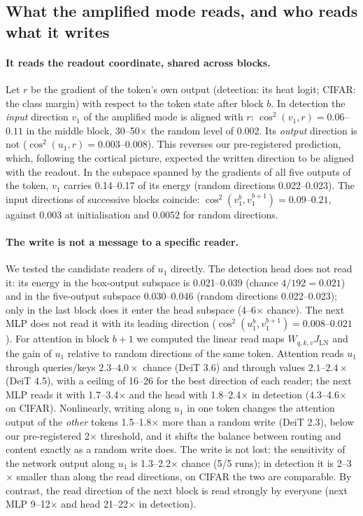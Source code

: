 \documentclass[10pt]{article}
\begin{document}
\subsection{What the amplified mode reads, and who reads what it writes}
\label{sec:readwrite}

\paragraph{It reads the readout coordinate, shared across blocks.} Let $r$ be the gradient of the token's own output (detection: its heat
logit; CIFAR: the class margin) with respect to the token state after block $b$. In detection the \emph{input} direction $v_1$ of the
amplified mode is aligned with $r$: $\cos^2(v_1,r)=0.06$--$0.11$ in the middle block, 30--50$\times$ the random level of 0.002. Its
\emph{output} direction is not ($\cos^2(u_1,r)=0.003$--$0.008$). This reverses our pre-registered prediction, which, following the cortical
picture, expected the written direction to be aligned with the readout. In the subspace spanned by the gradients of all five outputs of
the token, $v_1$ carries 0.14--0.17 of its energy (random directions 0.022--0.023). The input directions of successive blocks coincide:
$\cos^2(v_1^{b},v_1^{b+1})=0.09$--$0.21$, against 0.003 at initialisation and 0.0052 for random directions.

\paragraph{The write is not a message to a specific reader.} We tested the candidate readers of $u_1$ directly. The detection head does
not read it: its energy in the box-output subspace is 0.021--0.039 (chance $4/192=0.021$) and in the five-output subspace 0.030--0.046
(random directions 0.022--0.023); only in the last block does it enter the head subspace (4--6$\times$ chance). The next MLP does not read it with its leading direction
($\cos^2(u_1^b,v_1^{b+1})=0.008$--$0.021$). For attention in block $b+1$ we computed the linear read maps $W_{q,k,v}J_{\mathrm{LN}}$ and the
gain of $u_1$ relative to random directions of the same token. Attention reads $u_1$ through queries/keys $2.3$--$4.0\times$ chance (DeiT
3.6) and through values $2.1$--$2.4\times$ (DeiT 4.5), with a ceiling of 16--26 for the best direction of each reader; the next MLP reads it
with 1.7--3.4$\times$ and the head with 1.8--2.4$\times$ in detection (4.3--4.6$\times$ on CIFAR). Nonlinearly, writing along $u_1$ in one token changes the attention output of the
\emph{other} tokens 1.5--1.8$\times$ more than a random write (DeiT 2.3), below our pre-registered 2$\times$ threshold, and it shifts the
balance between routing and content exactly as a random write does. The write is not lost: the sensitivity of the network output along
$u_1$ is 1.3--2.2$\times$ chance (5/5 runs); in detection it is 2--3$\times$ smaller than along the read directions, on CIFAR the two are
comparable. By contrast, the read direction of the next block is read strongly by everyone (next MLP 9--12$\times$ and head
21--22$\times$ in detection).
\end{document}
